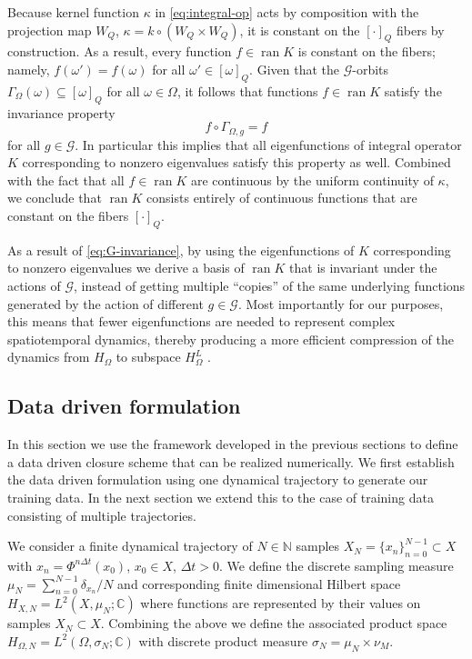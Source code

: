 \documentclass[letterpaper,10pt,3p,preprint]{elsarticle}
\newcommand{\Nbb}{\mathbb{N}}
\newcommand{\Cbb}{\mathbb{C}}
\newcommand{\Gcal}{\mathcal{G}}
\DeclareMathOperator{\ran}{ran}
\begin{document}
Because kernel function $\kappa$ in \eqref{eq:integral-op}
acts by composition with the projection map $W_Q$,
$\kappa=k\circ(W_Q\times W_Q)$,
it is constant on the $[\cdot]_Q$ fibers by construction.
As a result, every function $f\in\ran{K}$ is constant on the fibers;
namely, $f(\omega')=f(\omega)$ for all $\omega'\in [\omega]_Q$.
Given that the $\Gcal$-orbits
$\Gamma_\Omega(\omega)\subseteq [\omega]_Q$
for all $\omega\in\Omega$,
it follows that functions $f\in\ran{K}$
satisfy the invariance property
\begin{equation}\label{eq:G-invariance}
    f\circ\Gamma_{\Omega,g}=f
\end{equation}
for all $g\in\Gcal$.
In particular this implies that all eigenfunctions of integral operator
$K$ corresponding to nonzero eigenvalues satisfy this property as well.
Combined with the fact that all $f\in\ran{K}$ are continuous by
the uniform continuity of $\kappa$,
we conclude that $\ran{K}$ consists entirely of continuous functions
that are constant on the fibers $[\cdot]_Q$.

As a result of \eqref{eq:G-invariance},
by using the eigenfunctions of $K$ corresponding to
nonzero eigenvalues we derive a basis of $\ran{K}$ that is
invariant under the actions of $\Gcal$, instead of
getting multiple ``copies'' of the same underlying functions
generated by the action of different $g\in \Gcal$.
Most importantly for our purposes, this means that fewer eigenfunctions
are needed to represent complex spatiotemporal dynamics,
thereby producing a more efficient compression of the dynamics
from $H_\Omega$ to subspace $H_\Omega^L$
\cite{Giannakis2019vsa}.

\subsection{Data driven formulation}\label{sec:data-driven}
In this section we use the framework developed in the
previous sections to define a data driven closure scheme that
can be realized numerically.
We first establish the data driven formulation using one
dynamical trajectory to generate our training data.
In the next section we extend this to the case of
training data consisting of multiple trajectories.

We consider a finite dynamical trajectory of $N\in\Nbb$ samples
$X_N=\{x_n\}_{n=0}^{N-1}\subset X$
with $x_n=\Phi^{n\Delta t}(x_0)$, $x_0\in X$, $\Delta t>0$.
We define the discrete sampling measure
$\mu_N=\sum_{n=0}^{N-1}\delta_{x_n}/N$
and corresponding finite dimensional Hilbert space
$H_{X,N}=L^2(X,\mu_N;\Cbb)$
where functions are represented by their values
on samples $X_N\subset X$.
Combining the above we define the associated product space
$H_{\Omega,N}=L^2(\Omega,\sigma_{N};\Cbb)$
with discrete product measure
$\sigma_N=\mu_N\times\nu_M$.
\end{document}
